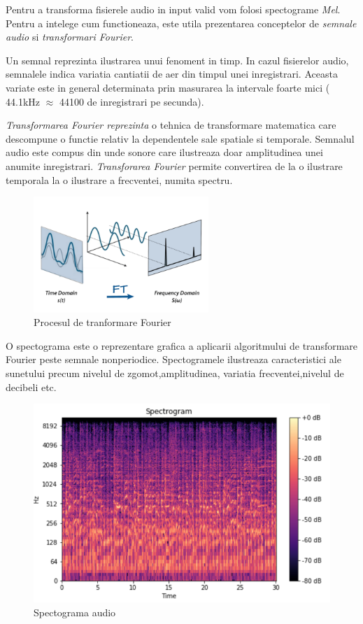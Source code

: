 \documentclass[a4paper]{article}
\begin{document}
Pentru a transforma fisierele audio in input valid vom folosi spectograme \textit{Mel}. Pentru a intelege cum
functioneaza, este utila prezentarea conceptelor de \textit{semnale audio} si \textit{transformari Fourier}.


Un semnal reprezinta ilustrarea unui fenoment in timp. In cazul fisierelor audio, semnalele indica variatia
cantiatii de aer din timpul unei inregistrari. Aceasta variate este in general determinata prin masurarea la
intervale foarte mici ( 44.1kHz $\approx$ 44100 de inregistrari pe secunda).

\textit{Transformarea Fourier reprezinta} o tehnica de transformare matematica care descompune o functie
relativ la dependentele sale spatiale si temporale.
Semnalul audio este compus din unde sonore care ilustreaza doar amplitudinea unei anumite inregistrari.
\textit{Transforarea Fourier} permite convertirea de la o ilustrare temporala la o ilustrare a frecventei,
numita spectru.


\begin{figure}[H]
	\centering
	\includegraphics[width = 2.6in]{fourier.png}
	\caption{Procesul de tranformare Fourier}
\label{result2}
\end{figure}


O spectograma este o reprezentare grafica a aplicarii algoritmului de transformare Fourier peste semnale
nonperiodice. Spectogramele ilustreaza caracteristici ale sunetului precum nivelul de zgomot,amplitudinea,
variatia frecventei,nivelul de decibeli etc.



\begin{figure}[H]
	\centering
	\includegraphics[width = 4.6in]{spec.png}
	\caption{Spectograma audio}
\label{result3}
\end{figure}
\end{document}
